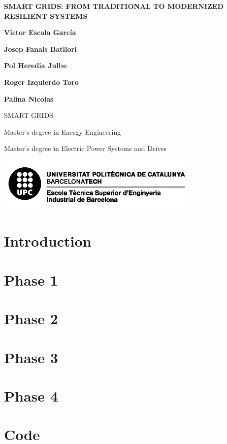 \documentclass[10pt, a4paper]{report}
\begin{document}
\begin{titlepage}
   \begin{center}
      \vspace*{2em}
      {\Large \bfseries SMART GRIDS: FROM TRADITIONAL TO MODERNIZED RESILIENT SYSTEMS}

       \vspace{6em}

       \textbf{Víctor Escala García}

       \textbf{Josep Fanals Batllori}

       \textbf{Pol Heredia Julbe}

       \textbf{Roger Izquierdo Toro}

       \textbf{Palina Nicolas}

       \vfill

       \vspace{1em}

       SMART GRIDS

       Master's degree in Energy Engineering

       Master's degree in Electric Power Systems and Drives

       \vspace{8em}
     
       \includegraphics[width=10cm]{Data/Logo.png}
            
   \end{center}
\end{titlepage}



\tableofcontents{}


\chapter{Introduction}


\chapter{Phase 1}


\chapter{Phase 2}


\chapter{Phase 3}


\chapter{Phase 4}



\chapter{Code}


\printbibliography[heading=bibintoc]
\end{document}
